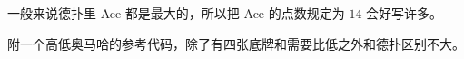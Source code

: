 一般来说德扑里 Ace 都是最大的，所以把 Ace 的点数规定为 $14$ 会好写许多。

附一个高低奥马哈的参考代码，除了有四张底牌和需要比低之外和德扑区别不大。

\inputminted{cpp}{../src/misc/高低奥马哈.cpp}
